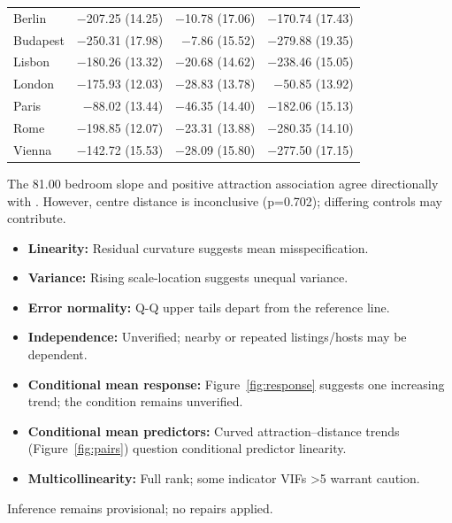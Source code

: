 \begin{table}[!htbp]
\begin{tabularx}{\linewidth}{@{}Xrrr@{}}
Berlin & \ensuremath{-}207.25 (14.25) & \ensuremath{-}10.78 (17.06) & \ensuremath{-}170.74 (17.43) \\
Budapest & \ensuremath{-}250.31 (17.98) & \ensuremath{-}7.86 (15.52) & \ensuremath{-}279.88 (19.35) \\
Lisbon & \ensuremath{-}180.26 (13.32) & \ensuremath{-}20.68 (14.62) & \ensuremath{-}238.46 (15.05) \\
London & \ensuremath{-}175.93 (12.03) & \ensuremath{-}28.83 (13.78) & \ensuremath{-}50.85 (13.92) \\
Paris & \ensuremath{-}88.02 (13.44) & \ensuremath{-}46.35 (14.40) & \ensuremath{-}182.06 (15.13) \\
Rome & \ensuremath{-}198.85 (12.07) & \ensuremath{-}23.31 (13.88) & \ensuremath{-}280.35 (14.10) \\
Vienna & \ensuremath{-}142.72 (15.53) & \ensuremath{-}28.09 (15.80) & \ensuremath{-}277.50 (17.15) \\
\bottomrule
\end{tabularx}
\end{table}

The \texteuro{}81.00 bedroom slope and positive attraction association agree directionally with \citet{gyodi2021}. However, centre distance is inconclusive (p=0.702); differing controls may contribute.

\begin{itemize}[leftmargin=*,itemsep=2pt,topsep=4pt]
\item \textbf{Linearity:} Residual curvature suggests mean misspecification.
\item \textbf{Variance:} Rising scale-location suggests unequal variance.
\item \textbf{Error normality:} Q-Q upper tails depart from the reference line.
\item \textbf{Independence:} Unverified; nearby or repeated listings/hosts may be dependent.
\item \textbf{Conditional mean response:} Figure~\ref{fig:response} suggests one increasing trend; the condition remains unverified.
\item \textbf{Conditional mean predictors:} Curved attraction--distance trends (Figure~\ref{fig:pairs}) question conditional predictor linearity.
\item \textbf{Multicollinearity:} Full rank; some indicator VIFs \textgreater{}5 warrant caution.
\end{itemize}

Inference remains provisional; no repairs applied.

